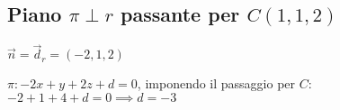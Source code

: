 \subsection{Piano $\pi \perp r$ passante per $C(1, 1, 2)$}
$\vec{n} = \vec{d}_r = (-2, 1, 2)$

$\pi: -2x + y +2z + d = 0$, imponendo il passaggio per $C$:
$-2 + 1 + 4 + d = 0 \implies d = -3$

